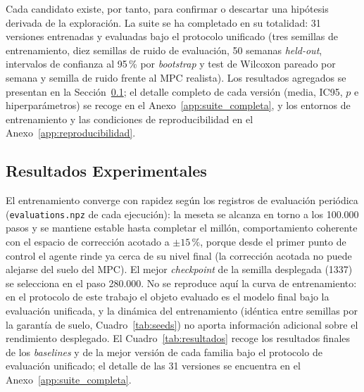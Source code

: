 \documentclass[12pt, a4paper, twoside]{report}
\begin{document}
Cada candidato existe, por tanto, para confirmar o descartar una hipótesis derivada
de la exploración. La suite se ha completado en su totalidad: 31 versiones
entrenadas y evaluadas bajo el protocolo unificado (tres semillas de
entrenamiento, diez semillas de ruido de evaluación, 50 semanas
\textit{held-out}, intervalos de confianza al 95\,\% por \textit{bootstrap} y
test de Wilcoxon pareado por semana y semilla de ruido frente al MPC realista). Los resultados
agregados se presentan en la Sección~\ref{sub:resultados}; el detalle completo
de cada versión (media, IC95, $p$ e hiperparámetros) se recoge en el
Anexo~\ref{app:suite_completa}, y los entornos de entrenamiento y las
condiciones de reproducibilidad en el Anexo~\ref{app:reproducibilidad}.

\subsection{Resultados Experimentales}
\label{sub:resultados}

El entrenamiento converge con rapidez según los registros de evaluación
periódica (\texttt{evaluations.npz} de cada ejecución): la meseta se alcanza
en torno a los 100.000 pasos y se mantiene estable hasta completar el millón,
comportamiento coherente con el espacio de corrección acotado a $\pm15\,\%$,
porque desde el primer punto de control el agente rinde ya cerca de su nivel
final (la corrección acotada no puede alejarse del suelo del MPC). El mejor
\textit{checkpoint} de la semilla desplegada (1337) se selecciona en el paso
280.000. No se reproduce aquí la curva de entrenamiento: en el protocolo de
este trabajo el objeto evaluado es el modelo final bajo la evaluación
unificada, y la dinámica del entrenamiento (idéntica entre semillas por la
garantía de suelo, Cuadro~\ref{tab:seeds}) no aporta información adicional
sobre el rendimiento desplegado. El Cuadro~\ref{tab:resultados} recoge los resultados finales de los
\textit{baselines} y de la mejor versión de cada familia bajo el protocolo de
evaluación unificado; el detalle de las 31 versiones se encuentra en el
Anexo~\ref{app:suite_completa}.
\end{document}
